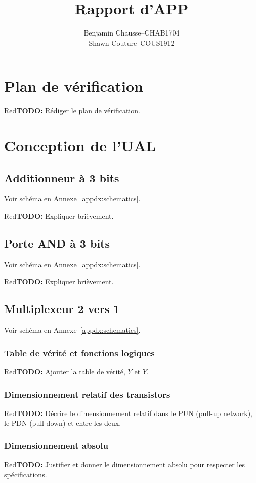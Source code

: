\documentclass[a11paper]{article}
\title{Rapport d'APP}
\author{
  \addtolength{\tabcolsep}{-0.4em}
  \begin{tabular}{rcl} %
      Benjamin Chausse & -- & CHAB1704 \\
      Shawn Couture    & -- & COUS1912 \\
  \end{tabular}
}
\newcommand{\todo}[1]{\begin{color}{Red}\textbf{TODO:} #1\end{color}}
\begin{document}
\maketitle
\newpage
\tableofcontents
\newpage

\section{Plan de vérification}
\todo{Rédiger le plan de vérification.}

\section{Conception de l'UAL}

\subsection{Additionneur à 3 bits}
Voir schéma en Annexe~\ref{appdx:schematics}.
\todo{Expliquer brièvement.}

\subsection{Porte AND à 3 bits}
Voir schéma en Annexe~\ref{appdx:schematics}.
\todo{Expliquer brièvement.}

\subsection{Multiplexeur 2 vers 1}
Voir schéma en Annexe~\ref{appdx:schematics}.

\subsubsection{Table de vérité et fonctions logiques}
\todo{Ajouter la table de vérité, $Y$ et $\overline{Y}$.}

\subsubsection{Dimensionnement relatif des transistors}
\todo{Décrire le dimensionnement relatif dans le PUN (pull-up network), le PDN (pull-down) et entre les deux.}

\subsubsection{Dimensionnement absolu}
\todo{Justifier et donner le dimensionnement absolu pour respecter les spécifications.}
\end{document}
